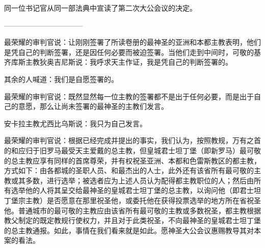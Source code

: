 同一位书记官从同一部法典中宣读了第二次大公会议的决定。\par

---------------------------------\par

最荣耀的审判官说：让刚刚签署了所读卷册的最神圣的亚洲和本都主教表明，他们是凭自己的判断签署，还是因任何必要而被迫签署。当他们走到中间时，可敬的基齐库斯主教狄奥吉尼斯说：我呼求天主作证，我是凭自己的判断签署的。\par

其余的人喊道：我们是自愿签署的。\par

最荣耀的审判官说：既然显然每一位主教的签署都不是出于任何必要，而是出于自己的意愿，那么让尚未签署的最神圣的主教们发言。\par

安卡拉主教尤西比乌斯说：我只为自己发言。\par

\par

最荣耀的审判官说：根据已经完成并提出的事实，我们认为，按照教规，万有之首的和应归于旧罗马最受天主爱戴的总主教，但皇城君士坦丁堡（即新罗马）最可敬的总主教应享有同样的首席尊荣，并有权祝圣亚洲、本都和色雷斯教区的都主教，方式如下：由各都城的圣职人员、和最杰出的人士，此外还有该省所有最可敬的主教或其多数，进行选举；被选者应为上述人员认为配得都主教职位的人；然后由所有选举他的人将其呈交给最神圣的皇城君士坦丁堡的总主教，以询问他（即君士坦丁堡宗主教）是否愿意在那里祝圣他，或委托他在获得投票选举的地方所在省祝圣他。普通城市的最可敬的主教应由该省所有最可敬的主教或多数祝圣，都主教根据教父制定的既定教规行使权力，并且对于此类祝圣，不向最神圣的皇城君士坦丁堡的总主教通报。如此，事情在我们看来就是如此。愿神圣大公会议惠赐教导其对本案的看法。\par

